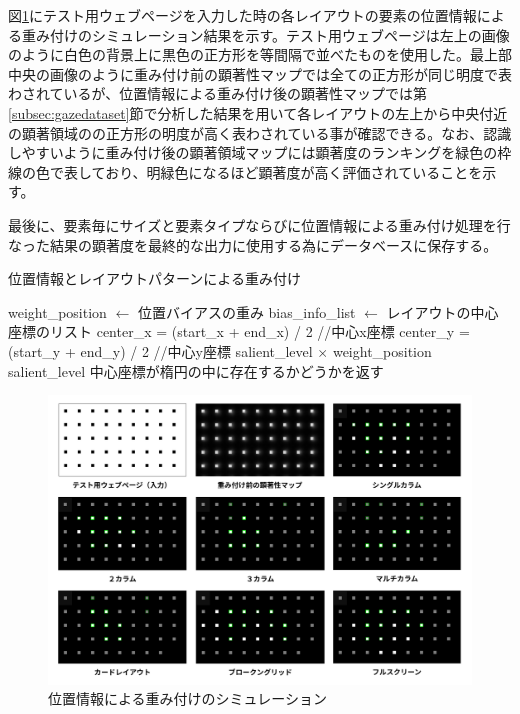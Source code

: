 \par 図\ref{fig_positionbias}にテスト用ウェブページを入力した時の各レイアウトの要素の位置情報による重み付けのシミュレーション結果を示す。テスト用ウェブページは左上の画像のように白色の背景上に黒色の正方形を等間隔で並べたものを使用した。最上部中央の画像のように重み付け前の顕著性マップでは全ての正方形が同じ明度で表わされているが、位置情報による重み付け後の顕著性マップでは第\ref{subsec:gazedataset}節で分析した結果を用いて各レイアウトの左上から中央付近の顕著領域のの正方形の明度が高く表わされている事が確認できる。なお、認識しやすいように重み付け後の顕著領域マップには顕著度のランキングを緑色の枠線の色で表しており、明緑色になるほど顕著度が高く評価されていることを示す。

\par 最後に、要素毎にサイズと要素タイプならびに位置情報による重み付け処理を行なった結果の顕著度を最終的な出力に使用する為にデータベースに保存する。

\begin{algorithm}[H]
  \small
    \caption{位置情報とレイアウトパターンによる重み付け}
    \label{alg:weight-position}
    \begin{algorithmic}
    \State weight\_position $\leftarrow$ 位置バイアスの重み
    \State bias\_info\_list $\leftarrow$ レイアウトの中心座標のリスト
    \State center\_x = (start\_x + end\_x) / 2 //中心x座標
    \State center\_y = (start\_y + end\_y) / 2 //中心y座標
        \State \Return salient\_level $\times$ weight\_position
      \Else
        \State \Return salient\_level
      \EndIf
    \EndFor
    \EndFunction
    \State
      \State \Return 中心座標が楕円の中に存在するかどうかを返す
    \EndFunction
    \end{algorithmic}
\end{algorithm}

\begin{figure}[H]
    \centering
    \includegraphics[width=12cm]{figures/06_positionbias.jpg}
    \caption{位置情報による重み付けのシミュレーション}
    \label{fig_positionbias}
\end{figure}


